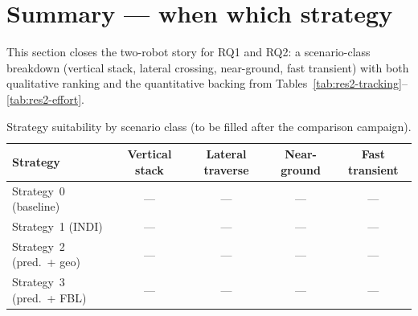 
\label{sec:res2-hybrid}

\section{Summary --- when which strategy}
\label{sec:res2-summary}

This section closes the two-robot story for RQ1 and RQ2: a scenario-class breakdown (vertical stack,
lateral crossing, near-ground, fast transient) with both qualitative ranking and the quantitative
backing from Tables~\ref{tab:res2-tracking}--\ref{tab:res2-effort}.


\begin{table}[t]
  \centering
  \caption{Strategy suitability by scenario class (to be filled after the comparison campaign).}
  \label{tab:res2-when-which}
  \small
  \begin{tabular}{@{}lcccc@{}}
    \toprule
    Strategy & Vertical stack & Lateral traverse & Near-ground & Fast transient \\
    \midrule
    Strategy~0 (baseline) & --- & --- & --- & --- \\
    Strategy~1 (INDI) & --- & --- & --- & --- \\
    Strategy~2 (pred.\ + geo) & --- & --- & --- & --- \\
    Strategy~3 (pred.\ + FBL) & --- & --- & --- & --- \\
    \bottomrule
  \end{tabular}
\end{table}

